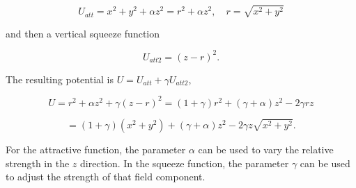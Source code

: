 \[U_{att} =  x^2 + y^2  + \alpha z^2 = r^2 + \alpha z^2, \quad r = \sqrt{x^2 + y^2}\]

and then a vertical squeeze function

\[U_{att2} = (z -r)^2.\]

The resulting potential is \(U = U_{att}  + \gamma U_{att2}\),

\[U = r^2 + \alpha z^2 +\gamma (z -r)^2  =  (1+\gamma)r^2 + (\gamma + \alpha) z^2 - 2\gamma rz\]

\[= (1+\gamma)(x^2 + y^2) + (\gamma + \alpha) z^2 - 2\gamma z\sqrt{x^2 + y^2}.\]

For the attractive function, the parameter \(\alpha\) can be used to
vary the relative strength in the \(z\) direction. In the squeeze
function, the parameter \(\gamma\) can be used to adjust the strength of
that field component.
